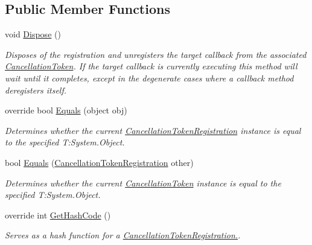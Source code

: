 \subsection*{Public Member Functions}
\begin{DoxyCompactItemize}
\item 
void \hyperlink{struct_system_1_1_threading_1_1_cancellation_token_registration_a7dfceaa1ee61cd0a5ee49879cc4e43d7}{Dispose} ()
\begin{DoxyCompactList}\small\item\em Disposes of the registration and unregisters the target callback from the associated \hyperlink{}{Cancellation\+Token}. If the target callback is currently executing this method will wait until it completes, except in the degenerate cases where a callback method deregisters itself. \end{DoxyCompactList}\item 
override bool \hyperlink{struct_system_1_1_threading_1_1_cancellation_token_registration_afd9c7e03354397c9b45710805cff2c98}{Equals} (object obj)
\begin{DoxyCompactList}\small\item\em Determines whether the current \hyperlink{}{Cancellation\+Token\+Registration} instance is equal to the specified T\+:\+System.\+Object. \end{DoxyCompactList}\item 
bool \hyperlink{struct_system_1_1_threading_1_1_cancellation_token_registration_a4f22e154e7cac436988ecb5bdc21c0f5}{Equals} (\hyperlink{struct_system_1_1_threading_1_1_cancellation_token_registration}{Cancellation\+Token\+Registration} other)
\begin{DoxyCompactList}\small\item\em Determines whether the current \hyperlink{}{Cancellation\+Token} instance is equal to the specified T\+:\+System.\+Object. \end{DoxyCompactList}\item 
override int \hyperlink{struct_system_1_1_threading_1_1_cancellation_token_registration_a4cf2b501efdf0cf5ad4565b4ce3cd8c3}{Get\+Hash\+Code} ()
\begin{DoxyCompactList}\small\item\em Serves as a hash function for a \hyperlink{}{Cancellation\+Token\+Registration.}. \end{DoxyCompactList}\end{DoxyCompactItemize}
